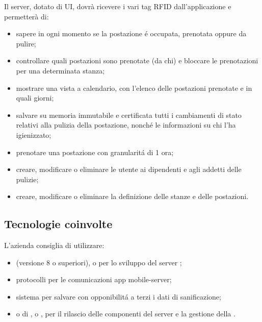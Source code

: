 Il server, dotato di UI, dovrà ricevere i vari tag RFID dall'applicazione e permetterà di:
\begin{itemize}
	\item sapere in ogni momento se la postazione \'e occupata, prenotata oppure da pulire;
	\item controllare quali postazioni sono prenotate (da chi) e bloccare le prenotazioni per una determinata stanza;
	\item mostrare una vista a calendario, con l’elenco delle postazioni prenotate e in quali giorni;
	\item salvare su memoria immutabile e certificata tutti i cambiamenti di stato relativi alla pulizia della postazione, nonch\'e le informazioni su chi l'ha igienizzato;
	\item prenotare una postazione con granularit\'a di 1 ora;
	\item creare, modificare o eliminare le utente ai dipendenti e agli addetti delle pulizie;
	\item creare, modificare o eliminare la definizione delle stanze e delle postazioni.
\end{itemize}

\subsection{Tecnologie coinvolte}
L'azienda consiglia di utilizzare:
\begin{itemize}
\item {} (versione 8 o superiori),  o  per lo sviluppo del server ;
\item protocolli  per le comunicazioni app mobile-server;
\item sistema  per salvare con opponibilit\'a a terzi i dati di sanificazione;
\item {} o di ,  o , per il rilascio delle componenti del server e la gestione della .
\end{itemize}

